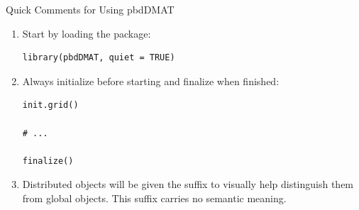 \begin{frame}[fragile]
  \begin{block}{Quick Comments for Using pbdDMAT}\pause
    \begin{enumerate}
      \item Start by loading the package:
\vspace{-.4cm}
\begin{lstlisting}
library(pbdDMAT, quiet = TRUE)
\end{lstlisting}
      \item Always initialize before starting and finalize when finished:
\vspace{-.4cm}
\begin{lstlisting}
init.grid()

# ...

finalize()
\end{lstlisting}
      \item   Distributed  objects will be given the suffix  to visually help distinguish them from global objects.  This suffix carries no semantic meaning.
    \end{enumerate}
  \end{block}
\end{frame}

